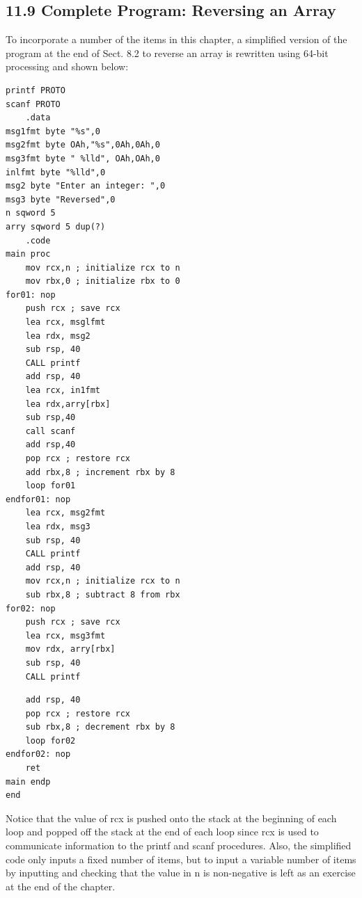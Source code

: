 \documentclass[10pt]{book}
\begin{document}
\subsection*{11.9 Complete Program: Reversing an Array}
To incorporate a number of the items in this chapter, a simplified version of the program at the end of Sect. 8.2 to reverse an array is rewritten using 64-bit processing and shown below:

\begin{verbatim}
printf PROTO
scanf PROTO
    .data
msg1fmt byte "%s",0
msg2fmt byte OAh,"%s",0Ah,0Ah,0
msg3fmt byte " %lld", OAh,OAh,0
inlfmt byte "%lld",0
msg2 byte "Enter an integer: ",0
msg3 byte "Reversed",0
n sqword 5
arry sqword 5 dup(?)
    .code
main proc
    mov rcx,n ; initialize rcx to n
    mov rbx,0 ; initialize rbx to 0
for01: nop
    push rcx ; save rcx
    lea rcx, msglfmt
    lea rdx, msg2
    sub rsp, 40
    CALL printf
    add rsp, 40
    lea rcx, in1fmt
    lea rdx,arry[rbx]
    sub rsp,40
    call scanf
    add rsp,40
    pop rcx ; restore rcx
    add rbx,8 ; increment rbx by 8
    loop for01
endfor01: nop
    lea rcx, msg2fmt
    lea rdx, msg3
    sub rsp, 40
    CALL printf
    add rsp, 40
    mov rcx,n ; initialize rcx to n
    sub rbx,8 ; subtract 8 from rbx
for02: nop
    push rcx ; save rcx
    lea rcx, msg3fmt
    mov rdx, arry[rbx]
    sub rsp, 40
    CALL printf
\end{verbatim}

\begin{verbatim}
    add rsp, 40
    pop rcx ; restore rcx
    sub rbx,8 ; decrement rbx by 8
    loop for02
endfor02: nop
    ret
main endp
end
\end{verbatim}

Notice that the value of rcx is pushed onto the stack at the beginning of each loop and popped off the stack at the end of each loop since rcx is used to communicate information to the printf and scanf procedures. Also, the simplified code only inputs a fixed number of items, but to input a variable number of items by inputting and checking that the value in n is non-negative is left as an exercise at the end of the chapter.


\end{document}

